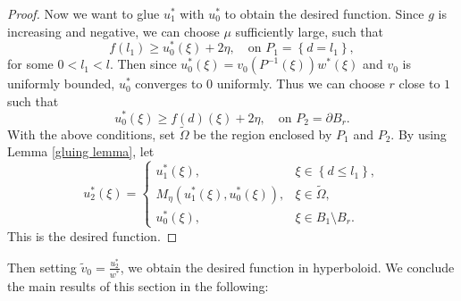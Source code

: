\documentclass[reqno]{amsart}
\theoremstyle{remark}
\theoremstyle{definition}
\numberwithin{equation}{section}
\begin{document}
\begin{proof}
    Now we want to glue ${u}^*_1$ with ${u}^*_0$ to obtain the desired function. Since $g$ is increasing and negative, we can choose $\mu$ sufficiently large, such that 
    \[
    f(l_1) \geqslant u^*_0(\xi) + 2\eta, \quad \text{on } P_1 = \left\{ d = l_1 \right\},
    \]
    for some $0 < l_1 < l$. Then since $u^*_0(\xi) = v_0(P^{-1}(\xi))w^*(\xi)$ and $v_0$ is uniformly bounded, $u^*_0$ converges to $0$ uniformly. Thus we can choose $r$ close to $1$ such that 
    \[
    u^*_0(\xi) \geqslant f(d)(\xi) + 2\eta, \quad \text{on } P_2 = \partial B_r.
    \]
    With the above conditions, set $\tilde{\Omega}$ be the region enclosed by $P_1$ and $P_2$. By using Lemma \ref{gluing lemma}, let
    \[
    {u}^*_2(\xi) = 
    \begin{cases}
    {u}^*_1(\xi), & \xi \in \left\{ d \leqslant l_1 \right\}, \\
    M_{\eta}({u}^*_1(\xi), {u}^*_0(\xi)), & \xi \in \tilde{\Omega}, \\
    {u}^*_0(\xi), & \xi \in B_1 \setminus B_r.
    \end{cases}
    \]
    This is the desired function.
\end{proof}

Then setting $\tilde{v}_0 = \frac{{u}^*_2}{w^*}$, we obtain the desired function in hyperboloid. We conclude the main results of this section in the following: 
\end{document}

